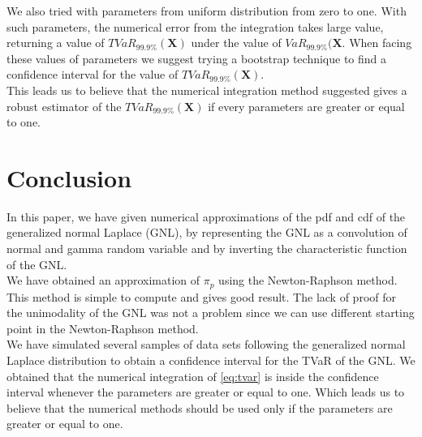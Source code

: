 \documentclass[12pt,travaildirige,nobabel, twoside]{dms}
\numberwithin{equation}{section}
\numberwithin{table}{chapter}
\numberwithin{figure}{chapter}
\begin{document}
We also tried with parameters from uniform distribution from zero to one. With such parameters, the numerical error from the integration takes large value, returning a value of $TVaR_{99.9\%}(\textbf{X})$ under the value of $VaR_{99.9\%}(\textbf{X}$. When facing these values of parameters we suggest trying a bootstrap technique to find a confidence interval for the value of $TVaR_{99.9\%}(\textbf{X})$.\\

This leads us to believe that the numerical integration method suggested gives a robust estimator of the $TVaR_{99.9\%}(\textbf{X})$ if every parameters are greater or equal to one. \\



\chapter{Conclusion}

In this paper, we have given numerical approximations of the pdf and cdf of the generalized normal Laplace (GNL), by representing the GNL as a convolution of normal and gamma random variable and by inverting the characteristic function of the GNL.\\

We have obtained an approximation of $\pi_p$ using the Newton-Raphson method. This method is simple to compute and gives good result. The lack of proof for the unimodality of the GNL was not a problem since we can use different starting point in the Newton-Raphson method.\\

We have simulated several samples of data sets following the generalized normal Laplace distribution to obtain a confidence interval for the TVaR of the GNL. We obtained that the numerical integration of \ref{eq:tvar} is inside the confidence interval whenever the parameters are greater or equal to one. Which leads us to believe that the numerical methods should be used only if the parameters are greater or equal to one.

%
%
\nocite{yamazato1978unimodality}

\end{document}

